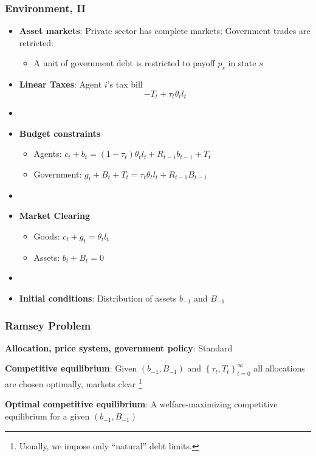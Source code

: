 \documentclass{beamer}
\begin{document}
\begin{frame}
 \frametitle{Environment, II}
 \begin{itemize}
\item \textbf{Asset markets}: Private sector has complete markets; Government trades are retricted:
\begin{itemize}
	\item  A unit of government debt is restricted to payoff $p_s$ in state $s$
\end{itemize}
  \item \textbf{Linear Taxes}: Agent $i$'s tax bill
\[- T_t + \tau_t \theta_{t}l_{t}\]

\item[]
  \item \textbf{Budget constraints}
  \begin{itemize}
   \item Agents: $ c_{t}+b_{t}=\left( 1-\tau _{t}\right) \theta _{t}l_{t}+R_{t-1}b_{t-1}+T_{t}$
\item Government: $g_{t}+B_{t}+T_t=\tau _{t}\theta_{t}l_{t}+R_{t-1}B_{t-1}$
  \end{itemize}

\item[]
  \item \textbf{Market Clearing}
  \begin{itemize}
   \item Goods: $c_{t}+g_t = \theta _{t} l_{t}$

   \item Assets: $b_{t}+B_{t}=0$
\end{itemize}
  \item[]

\item \textbf{Initial conditions}: Distribution of assets $b_{-1}$ and $B_{-1}$
\end{itemize}

\end{frame}


\begin{frame}
 \frametitle{Ramsey Problem}

\begin{definition}
\textbf{Allocation, price system, government policy}: Standard

\end{definition}

\begin{definition}
\textbf{Competitive equilibrium}: Given $\left(b_{-1},B_{-1}\right) $ and $\left\{ \tau _{t},T_{t}\right\} _{t=0}^{\infty }$
all allocations are chosen optimally, markets clear \footnote{Usually, we impose only  ``natural'' debt limits. }
\end{definition}

\begin{definition}
\textbf{Optimal competitive equilibrium}: A welfare-maximizing competitive
equilibrium for a given $\left( b_{-1},B_{-1}\right) $
\end{definition}

 \end{frame}
 
\end{document}
